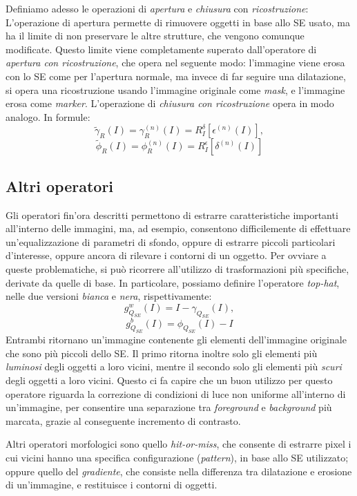 \par Definiamo adesso le operazioni di \textit{apertura} e \textit{chiusura} con \textit{ricostruzione}:\\
L'operazione di apertura permette di rimuovere oggetti in base allo SE usato, ma ha il limite di non preservare le altre strutture, che vengono comunque modificate. Questo limite viene completamente superato dall'operatore di \textit{apertura con ricostruzione}, che opera nel seguente modo: l'immagine viene erosa con lo SE come per l'apertura normale, ma invece di far seguire una dilatazione, si opera una ricostruzione usando l'immagine originale come \textit{mask}, e l'immagine erosa come \textit{marker}. L'operazione di \textit{chiusura con ricostruzione} opera in modo analogo. In formule:
\begin{equation}
	\label{eq:opening-reconstruction}
	\tilde{\gamma}_{R}(I) = \gamma_{R}^{(n)}(I) = R_{I}^{\delta}[\epsilon^{(n)}(I)],
\end{equation}
\begin{equation}
	\label{eq:closing-reconstruction}
	\tilde{\phi}_{R}(I) = \phi_{R}^{(n)}(I) = R_{I}^{\epsilon}[\delta^{(n)}(I)]
\end{equation}

\subsection{Altri operatori}
Gli operatori fin'ora descritti permettono di estrarre caratteristiche importanti all'interno delle immagini, ma, ad esempio, consentono difficilemente di effettuare un'equalizzazione di parametri di sfondo, oppure di estrarre piccoli particolari d'interesse, oppure ancora di rilevare i contorni di un oggetto. Per ovviare a queste problematiche, si pu\`o ricorrere all'utilizzo di trasformazioni pi\`u specifiche, derivate da quelle di base. In particolare, possiamo definire l'operatore \textit{top-hat}, nelle due versioni \textit{bianca} e \textit{nera}, rispettivamente:
\begin{equation}
	\label{eq:white-top-hat}
	g_{Q_{SE}}^{w}(I) = I - \gamma_{Q_{SE}}(I),
\end{equation}
\begin{equation}
	\label{eq:black-top-hat}
	g_{Q_{SE}}^{b}(I) = \phi_{Q_{SE}}(I) - I
\end{equation}
Entrambi ritornano un'immagine contenente gli elementi dell'immagine originale che sono pi\`u piccoli dello SE. Il primo ritorna inoltre solo gli elementi pi\`u \textit{luminosi} degli oggetti a loro vicini, mentre il secondo solo gli elementi pi\`u \textit{scuri} degli oggetti a loro vicini. Questo ci fa capire che un buon utilizzo per questo operatore riguarda la correzione di condizioni di luce non uniforme all'interno di un'immagine, per consentire una separazione tra \textit{foreground} e \textit{background} pi\`u marcata, grazie al conseguente incremento di contrasto.
\par Altri operatori morfologici sono quello \textit{hit-or-miss}, che consente di estrarre pixel i cui vicini hanno una specifica configurazione (\textit{pattern}), in base allo SE utilizzato; oppure quello del \textit{gradiente}, che consiste nella differenza tra dilatazione e erosione di un'immagine, e restituisce i contorni di oggetti.
